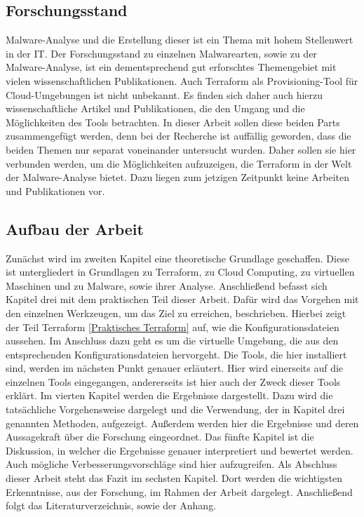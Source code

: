 \subsection{Forschungsstand}
Malware-Analyse und die Erstellung dieser ist ein Thema mit hohem Stellenwert in der IT. Der Forschungsstand zu einzelnen Malwarearten, sowie zu der Malware-Analyse, ist ein dementsprechend gut erforschtes Themengebiet mit vielen wissenschaftlichen Publikationen. Auch \dq Terraform \dq{} als Provisioning-Tool für Cloud-Umgebungen ist nicht unbekannt. Es finden sich daher auch hierzu wissenschaftliche Artikel und Publikationen, die den Umgang und die Möglichkeiten des Tools betrachten. 
\newline
In dieser Arbeit sollen diese beiden Parts zusammengefügt werden, denn bei der Recherche ist auffällig geworden, dass die beiden Themen nur separat voneinander untersucht wurden. Daher sollen sie hier verbunden werden, um die Möglichkeiten aufzuzeigen, die Terraform in der Welt der Malware-Analyse bietet. Dazu liegen zum jetzigen Zeitpunkt keine Arbeiten und Publikationen vor.
\subsection{Aufbau der Arbeit}
Zunächst wird im zweiten Kapitel eine theoretische Grundlage geschaffen. Diese ist untergliedert in Grundlagen zu \dq Terraform\dq, zu Cloud Computing, zu virtuellen Maschinen und zu Malware, sowie ihrer Analyse. 
\newline Anschließend befasst sich Kapitel drei mit dem praktischen Teil dieser Arbeit. Dafür wird das Vorgehen mit den einzelnen Werkzeugen, um das Ziel zu erreichen, beschrieben. Hierbei zeigt der Teil Terraform \ref{Praktisches Terraform} auf, wie die Konfigurationsdateien aussehen. Im Anschluss dazu geht es um die virtuelle Umgebung, die aus den entsprechenden Konfigurationsdateien hervorgeht. Die Tools, die hier installiert sind, werden im nächsten Punkt genauer erläutert. Hier wird einerseits auf die einzelnen Tools eingegangen, andererseits ist hier auch der Zweck dieser Tools erklärt.
\newline
Im vierten Kapitel werden die Ergebnisse dargestellt. Dazu wird die tatsächliche Vorgehensweise dargelegt und die Verwendung, der in Kapitel drei genannten Methoden, aufgezeigt. Außerdem werden hier die Ergebnisse und deren Aussagekraft über die Forschung eingeordnet. 
\newline
Das fünfte Kapitel ist die Diskussion, in welcher die Ergebnisse genauer interpretiert und bewertet werden. Auch mögliche Verbesserungsvorschläge sind hier aufzugreifen.
\newline
Als Abschluss dieser Arbeit steht das Fazit im sechsten Kapitel. Dort werden die wichtigsten Erkenntnisse, aus der Forschung, im Rahmen der Arbeit dargelegt. Anschließend folgt das Literaturverzeichnis, sowie der Anhang.
